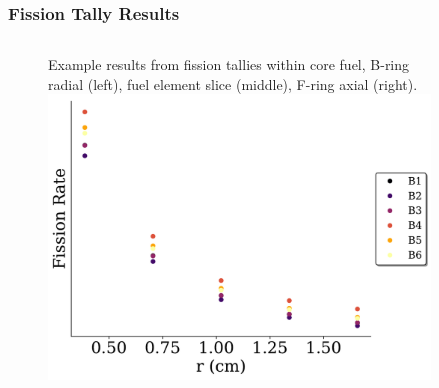 \documentclass[fleqn]{beamer}
\begin{document}
\begin{frame}
\frametitle{Fission Tally Results}

\begin{columns}[c]
\begin{column}{.5\textwidth}
\begin{figure}
\centering
Example results from fission tallies within core fuel, B-ring radial (left), fuel element slice (middle), F-ring axial (right).
\includegraphics[width = 1.0\textwidth]{radial_rr_density_B}
\end{figure}
\end{column}
\begin{column}{.5\textwidth}
\begin{figure}
\centering

\end{figure}
\end{column}
\end{columns}
\end{frame}
\end{document}
